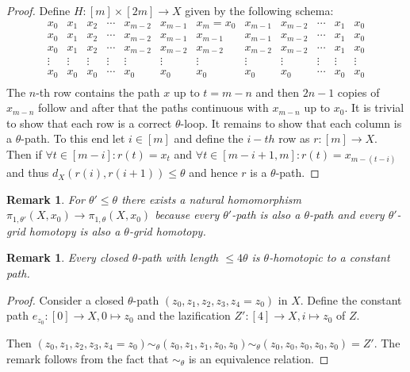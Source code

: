 \documentclass[a4paper, 11pt, twoside]{article}
\theoremstyle{break}
\theoremstyle{break}
\newtheorem{rem}[thm]{Remark}
\begin{document}
\begin{proof}
  Define $H\colon [m] \times [2m] \to X$ given by the following schema:
  \begin{equation*}
    \begin{matrix}
      x_0 & x_1 & x_2 & \cdots & x_{m-2} & x_{m-1} & x_m = x_0 & x_{m-1} & x_{m-2} & \cdots & x_1 & x_0 \\
      x_0 & x_1 & x_2 & \cdots & x_{m-2} & x_{m-1} & x_{m-1} & x_{m-1} & x_{m-2} & \cdots & x_1 & x_0 \\
      x_0 & x_1 & x_2 & \cdots & x_{m-2} & x_{m-2} & x_{m-2} & x_{m-2} & x_{m-2} & \cdots & x_1 & x_0 \\
      \vdots & \vdots & \vdots & \vdots & \vdots & \vdots & \vdots & \vdots & \vdots & \vdots & \vdots & \vdots \\
      x_0 & x_0 & x_0 & \cdots & x_0 & x_0 & x_0 & x_0 & x_0 & \cdots & x_0 & x_0 \\
    \end{matrix}
  \end{equation*}
  The $n$-th row contains the path $x$ up to $t = m-n$ and then $2n-1$ copies of $x_{m-n}$ follow and after that the paths continuous with $x_{m-n}$ up to $x_0$.
  It is trivial to show that each row is a correct $\theta$-loop. It remains to show that each column is a $\theta$-path. To this end let $i \in [m]$ and define the $i-th$ row as $r: [m] \to X$.
  Then if $\forall t \in [m-i]: r(t) = x_t$ and $\forall t \in [m-i+1, m]: r(t) = x_{m-(t-i)}$ and thus $d_X(r(i), r(i+1)) \leq \theta$ and hence $r$ is a $\theta$-path.
\end{proof}

\begin{rem}
  For $\theta' \leq \theta$ there exists a natural homomorphism $\pi_{1,\theta'}(X, x_0) \to \pi_{1,\theta}(X, x_0)$ 
  because every $\theta'$-path is also a $\theta$-path and every $\theta'$-grid homotopy is also a $\theta$-grid homotopy.
\end{rem}

\begin{rem}
  Every closed $\theta$-path with length $\leq 4\theta$ is $\theta$-homotopic to a constant path.
\end{rem}

\begin{proof}
  Consider a closed $\theta$-path $(z_0, z_1, z_2, z_3, z_4 = z_0)$ in $X$. 
  Define the constant path $e_{z_0}: [0] \to X, 0 \mapsto z_0$ and the lazification $Z': [4] \to X, i \mapsto z_0$ of $Z$.

  Then $(z_0, z_1, z_2, z_3, z_4 = z_0) \sim_{\theta} (z_0, z_1, z_1, z_0, z_0)\sim_{\theta} (z_0, z_0, z_0, z_0, z_0) = Z'$. The remark follows from the fact that $\sim_{\theta}$ is an equivalence relation.
\end{proof}
\end{document}
